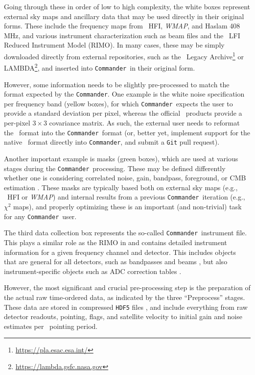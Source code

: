 \documentclass[twocolumn]{openjournal}
\def\WMAP{\textit{WMAP}}
\def\commander{\texttt{Commander}}
\begin{document}
Going through these in order of low to high complexity, the white boxes
represent external sky maps and ancillary data that may be used directly in
their original forms. These include the frequency maps from \Planck\ HFI,
\WMAP, and Haslam 408\,MHz, and various instrument characterization such as
beam files and the \Planck\ LFI Reduced Instrument Model (RIMO). In many cases,
these may be simply downloaded directly from external repositories, such as the
\Planck\ Legacy Archive\footnote{\url{https://pla.esac.esa.int/}} or
LAMBDA\footnote{\url{https://lambda.gsfc.nasa.gov}}, and inserted into
\commander\ in their original form.

However, some information needs to be slightly pre-processed to match the
format expected by the \commander. One example is the white noise specification
per frequency band (yellow boxes), for which \commander\ expects the user to
provide a standard deviation per pixel, whereas the official \Planck\ products
provide a per-pixel $3\times 3$ covariance matrix. As such, the external user
needs to reformat the \Planck\ format into the \commander\ format (or, better
yet, implement support for the native \Planck\ format directly into \commander,
and submit a \texttt{Git} pull request).

Another important example is masks (green boxes), which are used at various
stages during the \commander\ processing. These may be defined differently
whether one is considering correlated noise, gain, bandpass, foreground, or CMB
estimation \citep[e.g.,][]{bp06,bp07,bp11,bp12,bp13,bp14}. These masks are
typically based both on external sky maps (e.g., \Planck\ HFI or \WMAP) and
internal results from a previous \commander\ iteration (e.g., $\chi^2$ maps),
and properly optimizing these is an important (and non-trivial) task for any
\commander\ user.

The third data collection box represents the so-called \commander\ instrument
file. This plays a similar role as the RIMO in \Planck and contains detailed
instrument information for a given frequency channel and detector. This
includes objects that are general for all detectors, such as bandpasses and
beams \citep{bp08,bp09}, but also instrument-specific objects such as ADC
correction tables \citep{bp25}.

However, the most significant and crucial pre-processing step is the
preparation of the actual raw time-ordered data, as indicated by the three
``Preprocess'' stages. These data are stored in compressed \texttt{HDF5} files
\citep{bp03}, and include everything from raw detector readouts, pointing,
flags, and satellite velocity to initial gain and noise estimates per \Planck\
pointing period.
\end{document}
